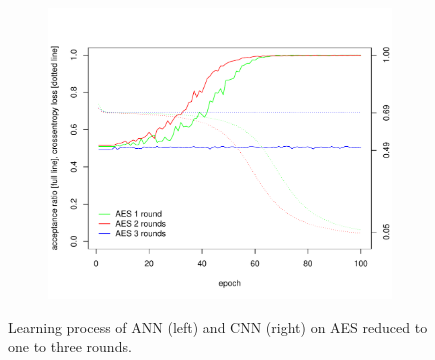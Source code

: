 \documentclass[
  print, %
  Table,   %
  nolof,     %
  nolot,     %
  11pt, %
  oneside  %
]{fithesis3}
\begin{document}
\begin{figure}[H]
\begin{changemargin}{-3cm}{-3cm}
\begin{subfigure}{.6\textwidth}
  \includegraphics[width=.98\textwidth]{./graphics/ann/cnn}
  \label{fig:ann-learning-cnn}
\end{subfigure}
\end{changemargin}
\caption{Learning process of ANN (left) and CNN (right) on AES reduced to one to three rounds.}
\label{fig:ann-learning}
\end{figure}






\end{document}

